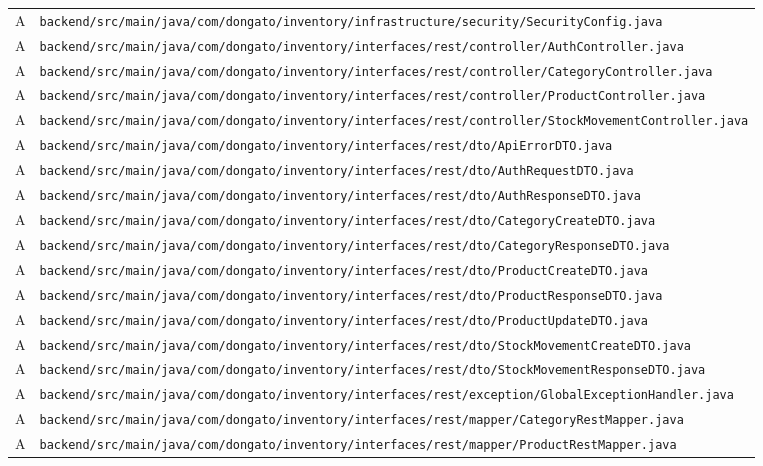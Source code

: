 \documentclass[11pt,oneside]{report}
\newcommand{\pathcode}[1]{{\ttfamily\scriptsize\nolinkurl{#1}}}
\begin{document}
\begin{longtable}{p{1.5cm} p{13cm}}
A & \pathcode{backend/src/main/java/com/dongato/inventory/infrastructure/security/SecurityConfig.java}\\
A & \pathcode{backend/src/main/java/com/dongato/inventory/interfaces/rest/controller/AuthController.java}\\
A & \pathcode{backend/src/main/java/com/dongato/inventory/interfaces/rest/controller/CategoryController.java}\\
A & \pathcode{backend/src/main/java/com/dongato/inventory/interfaces/rest/controller/ProductController.java}\\
A & \pathcode{backend/src/main/java/com/dongato/inventory/interfaces/rest/controller/StockMovementController.java}\\
A & \pathcode{backend/src/main/java/com/dongato/inventory/interfaces/rest/dto/ApiErrorDTO.java}\\
A & \pathcode{backend/src/main/java/com/dongato/inventory/interfaces/rest/dto/AuthRequestDTO.java}\\
A & \pathcode{backend/src/main/java/com/dongato/inventory/interfaces/rest/dto/AuthResponseDTO.java}\\
A & \pathcode{backend/src/main/java/com/dongato/inventory/interfaces/rest/dto/CategoryCreateDTO.java}\\
A & \pathcode{backend/src/main/java/com/dongato/inventory/interfaces/rest/dto/CategoryResponseDTO.java}\\
A & \pathcode{backend/src/main/java/com/dongato/inventory/interfaces/rest/dto/ProductCreateDTO.java}\\
A & \pathcode{backend/src/main/java/com/dongato/inventory/interfaces/rest/dto/ProductResponseDTO.java}\\
A & \pathcode{backend/src/main/java/com/dongato/inventory/interfaces/rest/dto/ProductUpdateDTO.java}\\
A & \pathcode{backend/src/main/java/com/dongato/inventory/interfaces/rest/dto/StockMovementCreateDTO.java}\\
A & \pathcode{backend/src/main/java/com/dongato/inventory/interfaces/rest/dto/StockMovementResponseDTO.java}\\
A & \pathcode{backend/src/main/java/com/dongato/inventory/interfaces/rest/exception/GlobalExceptionHandler.java}\\
A & \pathcode{backend/src/main/java/com/dongato/inventory/interfaces/rest/mapper/CategoryRestMapper.java}\\
A & \pathcode{backend/src/main/java/com/dongato/inventory/interfaces/rest/mapper/ProductRestMapper.java}\\

\end{longtable}
\end{document}
